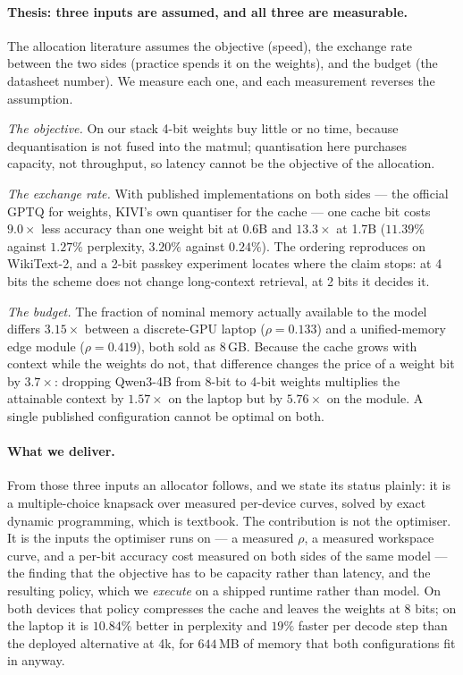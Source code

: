 \documentclass[5p]{elsarticle}
\newcommand{\rhoSym}{\rho}
\begin{document}
\paragraph*{Thesis: three inputs are assumed, and all three are measurable.}
The allocation literature assumes the objective (speed), the exchange rate
between the two sides (practice spends it on the weights), and the budget (the
datasheet number). We measure each one, and each measurement reverses the
assumption.

\emph{The objective.} On our stack 4-bit weights buy little or no time, because
dequantisation is not fused into the matmul; quantisation here purchases
capacity, not throughput, so latency cannot be the objective of the allocation.

\emph{The exchange rate.} With published implementations on both sides --- the
official GPTQ for weights, KIVI's own quantiser for the cache --- one cache bit
costs $9.0\times$ less accuracy than one weight bit at 0.6B and $13.3\times$ at
1.7B ($11.39\%$ against $1.27\%$ perplexity, $3.20\%$ against $0.24\%$). The
ordering reproduces on WikiText-2, and a 2-bit passkey experiment locates where
the claim stops: at 4 bits the scheme does not change long-context retrieval, at
2 bits it decides it.

\emph{The budget.} The fraction of nominal memory actually available to the
model differs $3.15\times$ between a discrete-GPU laptop ($\rhoSym=0.133$) and a
unified-memory edge module ($\rhoSym=0.419$), both sold as 8\,GB. Because the
cache grows with context while the weights do not, that difference changes the
price of a weight bit by $3.7\times$: dropping Qwen3-4B from 8-bit to 4-bit
weights multiplies the attainable context by $1.57\times$ on the laptop but by
$5.76\times$ on the module. A single published configuration cannot be optimal
on both.

\paragraph*{What we deliver.}
From those three inputs an allocator follows, and we state its status plainly:
it is a multiple-choice knapsack over measured per-device curves, solved by exact
dynamic programming, which is textbook. The contribution is not the optimiser.
It is the inputs the optimiser runs on --- a measured $\rhoSym$, a measured
workspace curve, and a per-bit accuracy cost measured on both sides of the same
model --- the finding that the objective has to be capacity rather than latency,
and the resulting policy, which we \emph{execute} on a shipped runtime rather
than model. On both devices that policy compresses the cache and leaves the
weights at 8 bits; on the laptop it is $10.84\%$ better in perplexity and $19\%$
faster per decode step than the deployed alternative at 4k, for $644$\,MB of
memory that both configurations fit in anyway.
\end{document}
